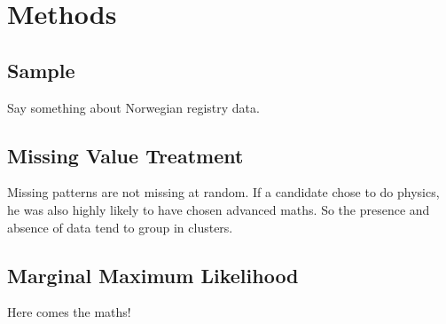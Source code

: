 \section{Methods}

\subsection{Sample}

Say something about Norwegian registry data.

\subsection{Missing Value Treatment}

Missing patterns are not missing at random. If a candidate chose to do physics, he was also highly likely to have chosen advanced maths. So the presence and absence of data tend to group in clusters.

\subsection{Marginal Maximum Likelihood}

Here comes the maths!